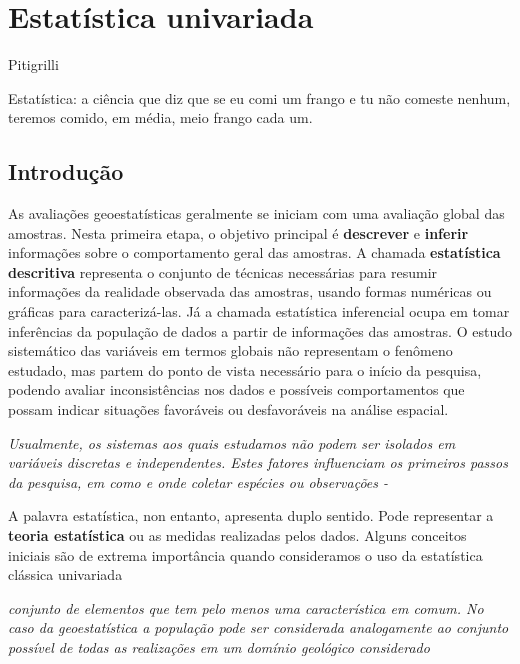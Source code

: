 \chapter{Estatística univariada}\label{est_univ}

\begin{myquoting}{Pitigrilli}
	
	Estatística: a ciência que diz que se eu comi um frango e tu não comeste nenhum, teremos comido, em média, meio frango cada um.
\end{myquoting}


\section{Introdução} 

	
As avaliações geoestatísticas geralmente se iniciam com uma avaliação global das amostras. Nesta primeira etapa, o objetivo principal é \textbf{descrever} e \textbf{inferir} informações sobre o comportamento geral das amostras. A chamada \textbf{estatística descritiva} representa o conjunto de técnicas necessárias para resumir informações da realidade observada das amostras, usando formas numéricas ou gráficas para caracterizá-las. Já a chamada estatística inferencial ocupa em tomar inferências da população de dados a partir de informações das amostras. O estudo sistemático das variáveis em termos globais não representam o fenômeno estudado, mas partem do ponto de vista necessário para o início da pesquisa, podendo avaliar inconsistências nos dados e possíveis comportamentos que possam indicar situações favoráveis ou desfavoráveis na análise espacial.


\begin{proposition}
	\textit{Usualmente, os sistemas aos quais estudamos não podem ser isolados em variáveis discretas e independentes. Estes fatores influenciam os primeiros passos da pesquisa, em como e onde coletar espécies ou observações  - \cite{borradaile2013statistics}}
\end{proposition}

A palavra estatística, non entanto, apresenta duplo sentido. Pode representar a \textbf{teoria estatística} ou as medidas realizadas pelos dados. Alguns conceitos iniciais são de extrema importância quando consideramos o uso da estatística clássica univariada 

\begin{definition}[População]
	\textit{conjunto de elementos que tem pelo menos uma característica em comum. No caso da geoestatística a população pode ser considerada analogamente ao conjunto possível de todas as realizações em um domínio geológico considerado}
\end{definition}

